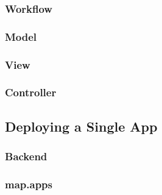 \subsubsection{Workflow} 
\label{subsubsec:Workflow}


\subsubsection{Model} 
\label{subsubsec:Model}


\subsubsection{View} 
\label{subsubsec:View}


\subsubsection{Controller} 
\label{subsubsec:Controller}



\subsection{Deploying a Single App}
\label{subsec:SingleAppDep}

\subsubsection{Backend} 
\label{subsubsec:Backend}

\subsubsection{map.apps} 
\label{subsubsec:mapapps}
